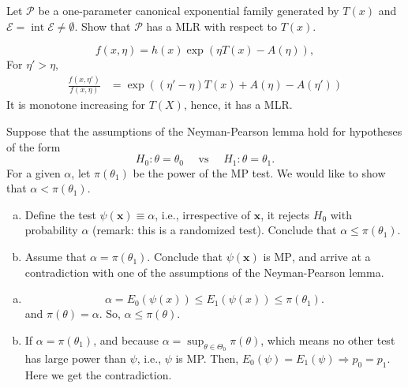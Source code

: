 \begin{ex}
    Let \(\mathcal{P}\) be a one-parameter canonical exponential family generated by \(T(x)\) and \(\mathcal{E}=\operatorname{int} \mathcal{E} \neq \emptyset\). Show that \(\mathcal{P}\) has a MLR with respect to \(T(x)\). 
\end{ex}

\begin{solution}
    \[
        f(x, \eta)=h(x)\exp\left(\eta T(x)-A(\eta)\right), 
    \]
    For $\eta'>\eta$, 
    \[
        \begin{aligned}
            \frac{f(x,\eta')}{f(x,\eta)}&=\exp\left((\eta'-\eta)T(x)+A(\eta)-A(\eta')\right)
        \end{aligned}
    \]
    It is monotone increasing for $T(X)$, hence, it has a MLR. 
\end{solution}

\begin{ex}
    Suppose that the assumptions of the Neyman-Pearson lemma hold for hypotheses of the form
    \[
        H_{0}: \theta=\theta_{0} \quad \text { vs } \quad H_{1}: \theta=\theta_{1} .
    \]
    For a given \(\alpha\), let \(\pi\left(\theta_{1}\right)\) be the power of the MP test. We would like to show that \(\alpha<\pi\left(\theta_{1}\right)\). 
    \begin{enumerate}[(a)]
        \item Define the test \(\psi(\mathbf{x}) \equiv \alpha\), i.e., irrespective of \(\mathbf{x}\), it rejects \(H_{0}\) with probability \(\alpha\) (remark: this is a randomized test). Conclude that \(\alpha \leq \pi\left(\theta_{1}\right)\). 
        \item Assume that \(\alpha=\pi\left(\theta_{1}\right)\). Conclude that \(\psi(\mathbf{x})\) is \(\mathrm{MP}\), and arrive at a contradiction with one of the assumptions of the Neyman-Pearson lemma. 
    \end{enumerate}
\end{ex}

\begin{solution}
    \begin{enumerate}[(a)]
        \item \[\alpha=E_0(\psi(x))\leqslant E_1(\psi(x))\leqslant\pi(\theta_1). \]
        and $\pi(\theta)=\alpha$. So, $\alpha\leqslant\pi(\theta)$. 
        \item If $\alpha=\pi(\theta_1)$, and because $\alpha=\sup_{\theta\in\Theta_0}\pi(\theta)$, which means no other test has large power than $\psi$, i.e., $\psi$ is MP. Then, $E_0(\psi)=E_1(\psi)\Rightarrow p_0=p_1$. Here we get the contradiction. 
    \end{enumerate}
\end{solution}

